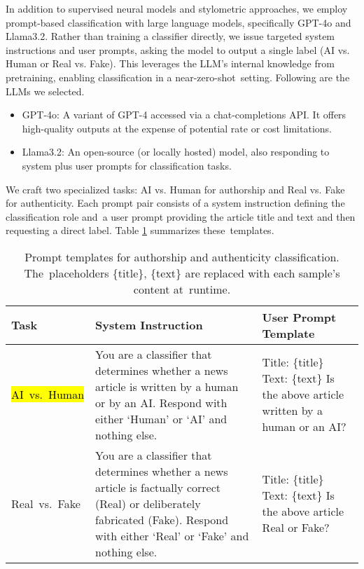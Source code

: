 \documentclass[electronics,article,accept,pdftex,moreauthors,electronics]{Definitions/mdpi}
\begin{document}
In addition to supervised neural models and stylometric approaches, we employ prompt-based classification with large language models, specifically GPT-4o and Llama3.2. Rather than training a classifier directly, we issue targeted system instructions and user prompts, asking the model to output a single label (AI vs. Human or Real vs. Fake). This leverages the LLM’s internal knowledge from pretraining, enabling classification in a near-zero-shot~setting. Following are the LLMs we selected.

\begin{itemize}
    \item GPT-4o: A variant of GPT-4 accessed via a chat-completions API. It offers high-quality outputs at the expense of potential rate or cost limitations.
    \item Llama3.2: An open-source (or locally hosted) model, also responding to system plus user prompts for classification tasks.
\end{itemize}

We craft two specialized tasks: AI vs. Human for authorship and Real vs. Fake for authenticity. Each prompt pair consists of a system instruction defining the classification role and~a user prompt providing the article title and text and then requesting a direct label. Table \ref{tab:prompt_templates} summarizes these~templates.

\begin{table}[H]
\tablesize{\small}
\caption{Prompt templates for authorship and authenticity classification. The~placeholders \{title\}, \{text\} are replaced with each sample’s content at~runtime.}
\label{tab:prompt_templates}
\begin{tabular}{l p{5cm} p{5cm}}
\toprule
\textbf{Task} & \textbf{System Instruction} & \textbf{User Prompt Template} \\
\midrule
\hl{AI~vs.~Human} %
 & 
\footnotesize{
You are a classifier that determines whether a news article is written by a human or by an AI. Respond with either `Human' or `AI' and nothing else.
} & 
\footnotesize{
Title: \{title\}  \break Text: \{text\}  \break Is the above article written by a human or an AI?
}
\\[6pt]
Real~vs.~Fake & 
\footnotesize{
You are a classifier that determines whether a news article is factually correct (Real) or deliberately fabricated (Fake). Respond with either `Real' or `Fake' and nothing else.
} & 
\footnotesize{
Title: \{title\} \break Text: \{text\} \break Is the above article Real or Fake?
}
\\
\bottomrule
\end{tabular}
\end{table}
\end{document}
